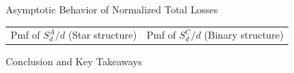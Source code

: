 \documentclass[11pt,xcolor={dvipsnames},hyperref={pdftex,pdfpagemode=UseNone,hidelinks,pdfdisplaydoctitle=true},usepdftitle=false]{beamer}
\begin{document}
\begin{frame}{Asymptotic Behavior of Normalized Total Losses}
\begin{center}
\begin{tabular}{cc}
{Pmf of $S_d^A/d$ (Star structure)} & 
{Pmf of $S_d^C/d$ (Binary structure)} \\
\end{tabular}
\end{center}
\end{frame}



\begin{frame}{Conclusion and Key Takeaways}

\end{frame}
\appendix
\end{document}
